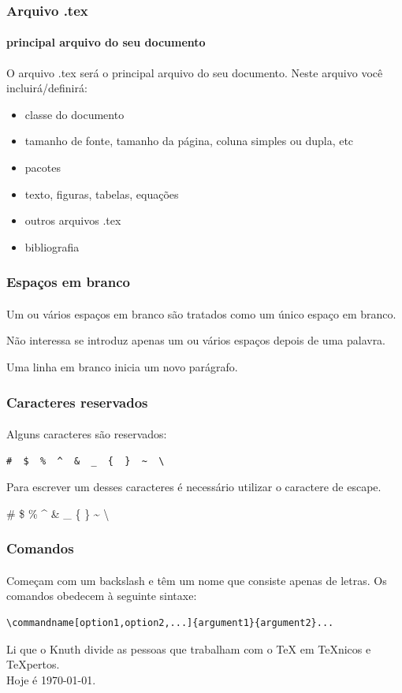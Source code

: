 \begin{frame}
\frametitle{Arquivo .tex}
\framesubtitle{principal arquivo do seu documento}
O arquivo .tex será o principal arquivo do seu documento. Neste arquivo você incluirá/definirá:
\begin{itemize}
    \item classe do documento
    \item tamanho de fonte, tamanho da página, coluna simples ou dupla, etc
    \item pacotes
    \item texto, figuras, tabelas, equações
    \item outros arquivos .tex
    \item bibliografia
\end{itemize}
\end{frame}


\begin{frame}[fragile]
\frametitle{Espaços em branco}
\framesubtitle{}
  Um ou vários espaços em branco são tratados como um único espaço em branco.
\begin{LTXexample}
Não interessa se introduz apenas
um ou vários     espaços depois
de uma palavra.

Uma linha em branco inicia um novo
parágrafo. 
\end{LTXexample}
\end{frame}


\begin{frame}[fragile]
\frametitle{Caracteres reservados}
\framesubtitle{}
Alguns caracteres são reservados:
\begin{verbatim}
#  $  %  ^  &  _  {  }  ~  \ 
\end{verbatim}

Para escrever um desses caracteres é necessário utilizar o caractere de escape.
  \vspace{1cm}
\begin{LTXexample}[commentstyle=\color{black}]
  \# \$ \% \^{} \& \_ \{ \} \~{} \textbackslash
\end{LTXexample}
\end{frame}


\begin{frame}[fragile]
\frametitle{Comandos}
\framesubtitle{}
Começam com um backslash e têm um nome que consiste apenas de letras. Os comandos obedecem à seguinte sintaxe:

\begin{verbatim}
\commandname[option1,option2,...]{argument1}{argument2}...
\end{verbatim}

\begin{LTXexample}
Li que o Knuth divide as
pessoas que trabalham com o \TeX{}
em \TeX{}nicos e \TeX pertos.\\
Hoje é \today.
\end{LTXexample}
\end{frame}


